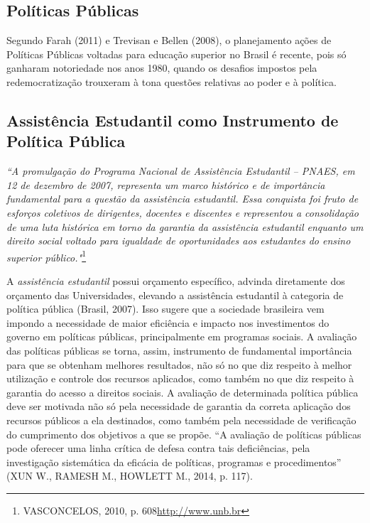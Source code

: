 
\subsection{Políticas Públicas}

Segundo Farah (2011) e Trevisan e Bellen (2008), o planejamento ações de Políticas Públicas voltadas para educação superior no Brasil é recente, pois só ganharam notoriedade nos anos 1980, quando os desafios impostos pela redemocratização trouxeram à tona questões relativas ao poder e à política.


\subsection{Assistência Estudantil como Instrumento de Política Pública}

\emph{“A promulgação do Programa Nacional de Assistência Estudantil – PNAES, em 12 de dezembro de 2007, representa um marco histórico e de importância fundamental para a questão da assistência estudantil. Essa conquista foi fruto de esforços coletivos de dirigentes, docentes e discentes e representou a consolidação de uma luta histórica em torno da garantia da assistência estudantil enquanto um direito social voltado para igualdade de oportunidades aos estudantes do ensino superior público."}\footnote{VASCONCELOS, 2010, p. 608\url{http://www.unb.br}}

A \emph{assistência estudantil} possui orçamento específico, advinda diretamente dos orçamento das Universidades, elevando a assistência estudantil à categoria de política pública (Brasil, 2007). Isso sugere que a sociedade brasileira vem impondo a necessidade de maior eficiência e impacto nos investimentos do governo em políticas públicas, principalmente em programas sociais. A avaliação das políticas públicas se torna, assim, instrumento de fundamental importância para que se obtenham melhores resultados, não só no que diz respeito à melhor utilização e controle dos recursos aplicados, como também no que diz respeito à garantia do acesso a direitos sociais. A avaliação de determinada política pública deve ser motivada não só pela necessidade de garantia da correta aplicação dos recursos públicos a ela destinados, como também pela necessidade de verificação do cumprimento dos objetivos a que se propõe. “A avaliação de políticas públicas pode oferecer uma linha crítica de defesa contra tais deficiências, pela investigação sistemática da eficácia de políticas, programas e procedimentos” (XUN W., RAMESH M., HOWLETT M., 2014, p. 117).

